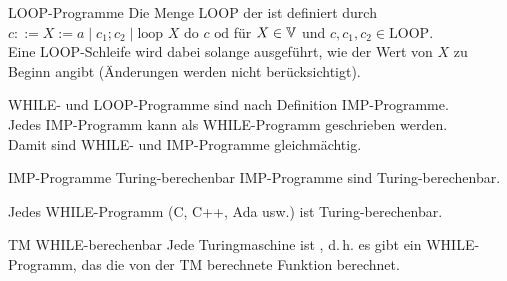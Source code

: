 \begin{Def}{LOOP-Programme}
    Die Menge LOOP der  ist definiert durch\\
    $c ::= X := a \;|\; c_1; c_2 \;|\; \text{loop } X \text{ do } c \text{ od}$
    für $X \in \mathbb{V}$ und $c, c_1, c_2 \in \text{LOOP}$.\\
    Eine LOOP-Schleife wird dabei solange ausgeführt, wie der Wert von $X$ zu Beginn angibt
    (Änderungen werden nicht berücksichtigt).
\end{Def}

\linie
\pagebreak

\begin{Bem}
    WHILE- und LOOP-Programme sind nach Definition IMP-Programme.\\
    Jedes IMP-Programm kann als WHILE-Programm geschrieben werden.\\
    Damit sind WHILE- und IMP-Programme gleichmächtig.
\end{Bem}

\begin{Satz}{IMP-Programme Turing-berechenbar}
    IMP-Programme sind Turing-berechenbar.
\end{Satz}

\begin{Kor}
    Jedes WHILE-Programm (C, C++, Ada usw.) ist Turing-berechenbar.
\end{Kor}

\begin{Satz}{TM WHILE-berechenbar}
    Jede Turingmaschine ist , d.\,h. es gibt ein WHILE-Programm, das die
    von der TM berechnete Funktion berechnet.
\end{Satz}


